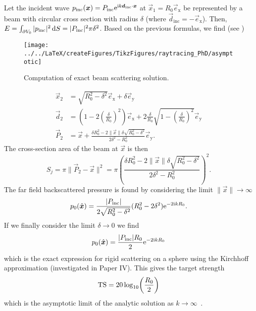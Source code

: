 Let the incident wave $p_{\mathrm{inc}}(\vec{x}) = P_{\mathrm{inc}}\euler^{\imag k \vec{d}_{\mathrm{inc}}\cdot\vec{x}}$ at $\vec{x}_1 = R_0\vec{e}_{\mathrm{x}}$ be represented by a beam with circular cross section with radius $\delta$ (where $\vec{d}_{\mathrm{inc}}=-\vec{e}_{\mathrm{x}}$).
Then, $E = \int_{\partial V_0} |p_{\mathrm{inc}}|^2\, \mathrm{d} S = |P_{\mathrm{inc}}|^2\pi\delta^2$.
Based on the previous formulas, we find (see )
\begin{figure}
	\centering
	\texttt{[image: ../../LaTeX/createFigures/TikzFigures/raytracing\_PhD/asymptotic]}
	\caption{Computation of exact beam scattering solution.}
	\label{Fig:asymptotic}
\end{figure}%
\begin{align*}
	\vec{x}_2 &= \sqrt{R_0^2-\delta^2}\vec{e}_{\mathrm{x}}+\delta\vec{e}_{\mathrm{y}}\\
	\vec{d}_2 &= \left(1-2\left(\frac{\delta}{R_0}\right)^2\right)\vec{e}_{\mathrm{x}}+2\frac{\delta}{R_0}\sqrt{1-\left(\frac{\delta}{R_0}\right)^2}\vec{e}_{\mathrm{y}}\\
	\vec{P}_2 &= \vec{x} + \frac{\delta R_0^2-2\|\vec{x}\|\delta\sqrt{R_0^2-\delta^2}}{2\delta^2-R_0^2}\vec{e}_{\mathrm{y}}.
\end{align*}
The cross-section area of the beam at $\vec{x}$ is then
\begin{equation*}
	S_j = \pi\|\vec{P}_2-\vec{x}\|^2 = \pi\left(\frac{\delta R_0^2-2\|\vec{x}\|\delta\sqrt{R_0^2-\delta^2}}{2\delta^2-R_0^2}\right)^2.
\end{equation*}
The far field backscattered pressure is found by considering the limit $\|\vec{x}\|\to\infty$
\begin{equation*}
	p_0(\hat{\vec{x}}) = \frac{|P_{\mathrm{inc}}|}{2\sqrt{R_0^2-\delta^2}}(R_0^2-2\delta^2)\euler^{-2\imag k R_0}.
\end{equation*}
If we finally consider the limit $\delta\to 0$ we find
\begin{equation*}
	p_0(\hat{\vec{x}}) = \frac{|P_{\mathrm{inc}}|R_0}{2}\euler^{-2\imag k R_0}
\end{equation*}
which is the exact expression for rigid scattering on a sphere using the Kirchhoff approximation (investigated in Paper IV). This gives the target strength
\begin{equation*}
	\TS = 20\log_{10}\left(\frac{R_0}{2}\right)
\end{equation*}
which is the asymptotic limit of the analytic solution as $k\to\infty$~\cite{Fillinger2014aen}.

